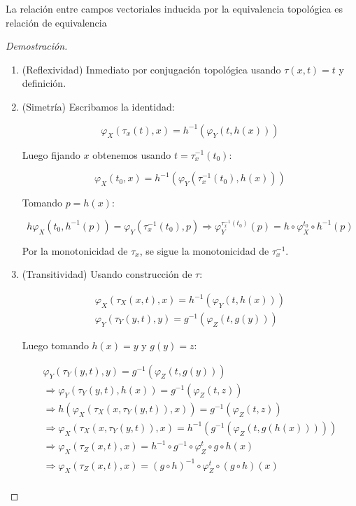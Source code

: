 \begin{prop}
	La relación entre campos vectoriales inducida por la equivalencia topológica es relación de equivalencia
\end{prop}

\begin{proof}[Demostración]
	
	\begin{enumerate}
		\item  (Reflexividad) Inmediato por conjugación topológica usando $\tau(x,t) = t$ y definición.
		
		\item (Simetría) Escribamos la identidad:
		
		\begin{equation*}
			\varphi_{X}(\tau_x(t),x) = h^{-1}(\varphi_Y(t, h(x)) )
		\end{equation*}
		
		Luego fijando $x$ obtenemos usando $t = \tau_x^{-1}(t_0)$:
		
		\begin{equation*}
			\varphi_{X}(t_0,x) = h^{-1}(\varphi_Y(\tau_x^{-1}(t_0), h(x)) )
		\end{equation*}
		
		Tomando $p = h(x)$:
		
		\begin{equation*}
			h\varphi_{X}(t_0,h^{-1}(p)) = \varphi_Y(\tau_x^{-1}(t_0) , p ) \Rightarrow \varphi_Y^{\tau_x^{-1}(t_0) } (p) =  h\circ \varphi_{X}^{t_0}\circ h^{-1}(p) 
		\end{equation*}
		
		Por la monotonicidad de $\tau_x$, se sigue la monotonicidad de $\tau_x^{-1}$.
		
		\item (Transitividad)  Usando construcción de $\tau$:
		
		\begin{align*}
			\varphi_{X}(\tau_{X}(x,t), x ) = h^{-1}(\varphi_Y(t, h(x) )  )\\	
			\varphi_{Y}(\tau_{Y}(y,t), y) = g^{-1}(\varphi_Z(t, g(y) )  )
		\end{align*}
		
		Luego tomando $h(x) = y$ y $g(y) = z$:
		
		\begin{align*}
			\varphi_{Y}(\tau_{Y}(y,t), y) = g^{-1}(\varphi_Z(t, g(y) )  ) \\
			\Rightarrow  \varphi_{Y}(\tau_{Y}(y,t), h(x)) = g^{-1}(\varphi_Z(t, z )  )\\
			\Rightarrow  h(\varphi_{X}(\tau_{X}(x,\tau_{Y}(y,t) ), x ) ) = g^{-1}(\varphi_Z(t, z )  )\\
			\Rightarrow  \varphi_{X}(\tau_{X}(x,\tau_{Y}(y,t) ), x )  = h^{-1}(g^{-1}(\varphi_Z(t, g(h(x)) )  ))\\
			\Rightarrow  \varphi_{X}(\tau_Z(x,t), x )  = h^{-1}\circ g^{-1} \circ \varphi_Z^t \circ g\circ h (x) \\
			\Rightarrow  \varphi_{X}(\tau_Z(x,t), x )  = (g\circ h)^{-1} \circ \varphi_Z^t \circ (g\circ h) (x) \\
		\end{align*}
		

\end{enumerate}
\end{proof}
